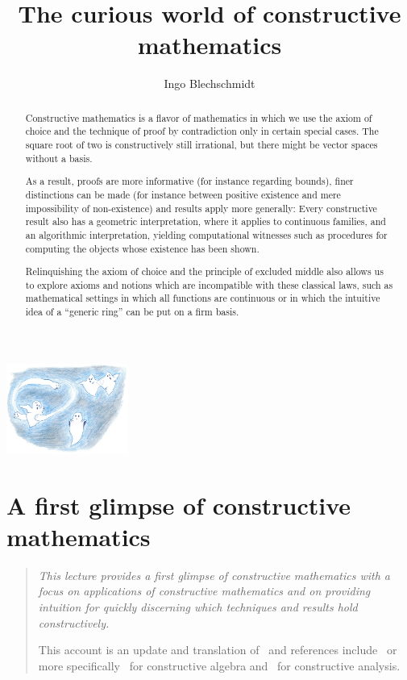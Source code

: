 \documentclass[10pt,reqno,a4paper,openany]{amsbook}
\title{The curious world of constructive mathematics}
\author{Ingo Blechschmidt \vspace*{-2em}}
\theoremstyle{definition}
\theoremstyle{plain}
\theoremstyle{remark}
\newcommand{\?}{\,{:}\,}
\renewcommand{\_}{\mathpunct{.}\,}
\newenvironment{intro}{\begin{quote}}{\end{quote}\bigskip\noindent}
\begin{document}
\begin{abstract}
Constructive mathematics is a flavor of mathematics in which we use the
axiom of choice and the technique of proof by contradiction only in
certain special cases. The square root of two is constructively still
irrational, but there might be vector spaces without a basis.

As a result, proofs are more informative (for instance regarding
bounds), finer distinctions can be made (for instance between positive
existence and mere impossibility of non-existence) and results apply
more generally: Every constructive result also has a geometric
interpretation, where it applies to continuous families, and an
algorithmic interpretation, yielding computational witnesses such as
procedures for computing the objects whose existence has been shown.

Relinquishing the axiom of choice and the principle of excluded middle also
allows us to explore axioms and notions which are incompatible with
these classical laws, such as mathematical settings in which all
functions are continuous or in which the intuitive idea of a ``generic
ring'' can be put on a firm basis.
\end{abstract}

{
\renewcommand{\newpage}{\ }
\renewcommand{\vfill}{\ }
\renewcommand{\vfil}{\ }
\enlargethispage{7em}
{\vspace*{-6em}\centering\includegraphics[width=0.3\textwidth]{phantoms}\par}
\maketitle
}

\setcounter{tocdepth}{1}
{
\renewcommand{\newpage}{\ }
\tableofcontents
}
\thispagestyle{empty}


\chapter{A first glimpse of constructive mathematics}

\begin{intro}
\it
This lecture provides a first glimpse of constructive mathematics with a
focus on applications of constructive mathematics and on providing
intuition for quickly discerning which techniques and results hold
constructively.

This account is an update and translation of~\cite[Section~1]{blechschmidt:pizzaseminar}
and references
include~\cite{bauer:five-stages-video,bauer:five-stages-article,avigad:constructive,sep:intuitionistic-logic,dummett:basis,melikhov:intuitionistic-logic,streicher:constructive}
or more
specifically~\cite{mines-richman-ruitenburg:constructive-algebra,lombardi-quitte:constructive-algebra}
for constructive algebra and~\cite{bishop-bridges:bible} for constructive
analysis.
\end{intro}
\end{document}
